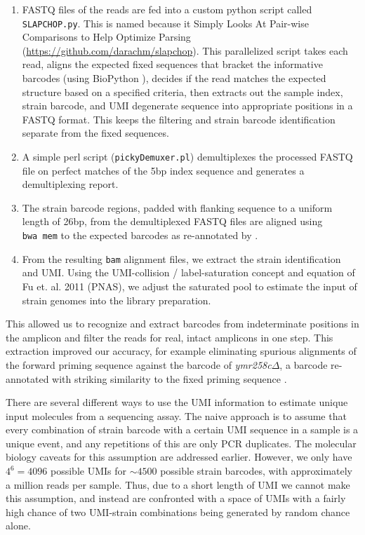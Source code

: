 \begin{enumerate}
  \setlength\itemsep{1em}
  \item
  FASTQ files of the reads are fed into a custom python script called
  \texttt{SLAPCHOP.py}. This is named because it Simply Looks At
  Pair-wise Comparisons to Help Optimize Parsing 
  (\url{https://github.com/darachm/slapchop}). This
  parallelized script takes each read, aligns the expected fixed
  sequences that bracket the informative barcodes (using
  BioPython \cite{cock2009biopython}), decides if the read matches the
  expected structure based on a specified criteria, then extracts out 
  the sample index, strain barcode, and UMI degenerate sequence into 
  appropriate positions in a FASTQ format. This keeps the filtering 
  and strain barcode identification separate from the fixed sequences.
  \item
  A simple perl script (\texttt{pickyDemuxer.pl}) demultiplexes the
  processed FASTQ file on perfect matches of the 5bp index sequence and
  generates a demultiplexing report.
  \item
  The strain barcode regions, padded with flanking sequence to a uniform
  length of 26bp, from the demultiplexed FASTQ files are aligned using
  \texttt{bwa\ mem} \parencite{li2013aligning}
  to the
  expected barcodes as re-annotated by \cite{smith2009quantitative}.
  \item
  From the resulting \texttt{bam} alignment files, we extract the strain
  identification and UMI. Using the UMI-collision / label-saturation
  concept and equation of Fu et. al. 2011 (PNAS), we adjust the
  saturated pool to estimate the input of strain genomes into the
  library preparation.
\end{enumerate}

This allowed us to recognize and extract barcodes from indeterminate
positions in the amplicon and filter the reads for real, intact
amplicons in one step. This extraction improved our accuracy, for
example eliminating spurious alignments of the forward priming sequence
against the barcode of \emph{ymr258c}\(\Delta\), a barcode re-annotated
with striking similarity to the fixed priming sequence
\parencite{smith2009quantitative}.

There are several different ways to use the UMI information to estimate
unique input molecules from a sequencing assay. The naive approach is to
assume that every combination of strain barcode with a certain UMI
sequence in a sample is a unique event, and any repetitions of this are
only PCR duplicates. 
The molecular biology caveats for this assumption are addressed 
earlier.
However, we only have \(4^6=4096\) possible UMIs for \(\sim4500\) 
possible strain
barcodes, with approximately a million reads per sample. Thus, due to a
short length of UMI we cannot make this assumption, and instead are
confronted with a space of UMIs with a fairly high chance of two
UMI-strain combinations being generated by random chance alone. 

